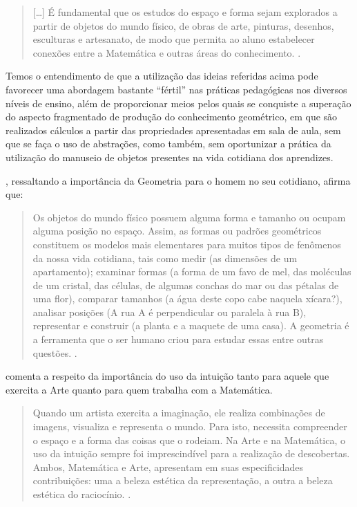 \begin{refsection}
    \begin{quotation}
        [\dots] É fundamental que os estudos do espaço e forma sejam explorados a partir de objetos do mundo físico, de obras de arte, pinturas, desenhos, esculturas e artesanato, de modo que permita ao aluno estabelecer conexões entre a Matemática e outras áreas do conhecimento. \cite[p.~51]{ParâmetrosCurricularesMatematica1998}.
    \end{quotation}

    Temos o entendimento de que a utilização das ideias referidas acima pode favorecer uma abordagem bastante ``fértil'' nas práticas pedagógicas nos diversos níveis de ensino, além de proporcionar meios pelos quais se conquiste a superação do aspecto fragmentado de produção do conhecimento geométrico, em que são realizados cálculos a partir das propriedades apresentadas em sala de aula, sem que se faça o uso de abstrações, como também, sem oportunizar a prática da utilização do manuseio de objetos presentes na vida cotidiana dos aprendizes. 

    \textcite{LAURO2008Discutindo}, ressaltando a importância da Geometria para o homem no seu cotidiano, afirma que:

    \begin{quotation}
        Os objetos do mundo físico possuem alguma forma e tamanho ou ocupam alguma posição no espaço. Assim, as formas ou padrões geométricos constituem os modelos mais elementares para muitos tipos de fenômenos da nossa vida cotidiana, tais como medir (as dimensões de um apartamento); examinar formas (a forma de um favo de mel, das moléculas de um cristal, das células, de algumas conchas do mar ou das pétalas de uma flor), comparar tamanhos (a água deste copo cabe naquela xícara?), analisar posições (A rua A é perpendicular ou paralela à rua B), representar e construir (a planta e a maquete de uma casa). A geometria é a ferramenta que o ser humano criou para estudar essas entre outras questões. \cite[p.~178]{LAURO2008Discutindo}.
    \end{quotation}

    \textcite{PEREIRA2016Arte} comenta a respeito da importância do uso da intuição tanto para aquele que exercita a Arte quanto para quem trabalha com a Matemática. 

    \begin{quotation}
        Quando um artista exercita a imaginação, ele realiza combinações de imagens, visualiza e representa o mundo. Para isto, necessita compreender o espaço e a forma das coisas que o rodeiam. Na Arte e na Matemática, o uso da intuição sempre foi imprescindível para a realização de descobertas. Ambos, Matemática e Arte, apresentam em suas especificidades contribuições: uma a beleza estética da representação, a outra a beleza estética do raciocínio. \cite[p.~33--34]{PEREIRA2016Arte}.
    \end{quotation}


\end{refsection}
